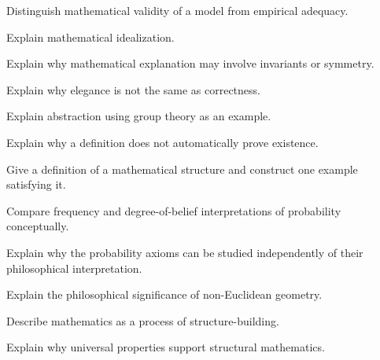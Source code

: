 \begin{exercise}[3]
Distinguish mathematical validity of a model from empirical adequacy.
\end{exercise}

\begin{exercise}[3]
Explain mathematical idealization.
\end{exercise}

\begin{exercise}[3]
Explain why mathematical explanation may involve invariants or symmetry.
\end{exercise}

\begin{exercise}[3]
Explain why elegance is not the same as correctness.
\end{exercise}

\begin{exercise}[3]
Explain abstraction using group theory as an example.
\end{exercise}

\begin{exercise}[2]
Explain why a definition does not automatically prove existence.
\end{exercise}

\begin{exercise}[3]
Give a definition of a mathematical structure and construct one example
satisfying it.
\end{exercise}

\begin{exercise}[3]
Compare frequency and degree-of-belief interpretations of probability
conceptually.
\end{exercise}

\begin{exercise}[3]
Explain why the probability axioms can be studied independently of their
philosophical interpretation.
\end{exercise}

\begin{exercise}[3]
Explain the philosophical significance of non-Euclidean geometry.
\end{exercise}

\begin{exercise}[3]
Describe mathematics as a process of structure-building.
\end{exercise}

\begin{exercise}[3]
Explain why universal properties support structural mathematics.
\end{exercise}


